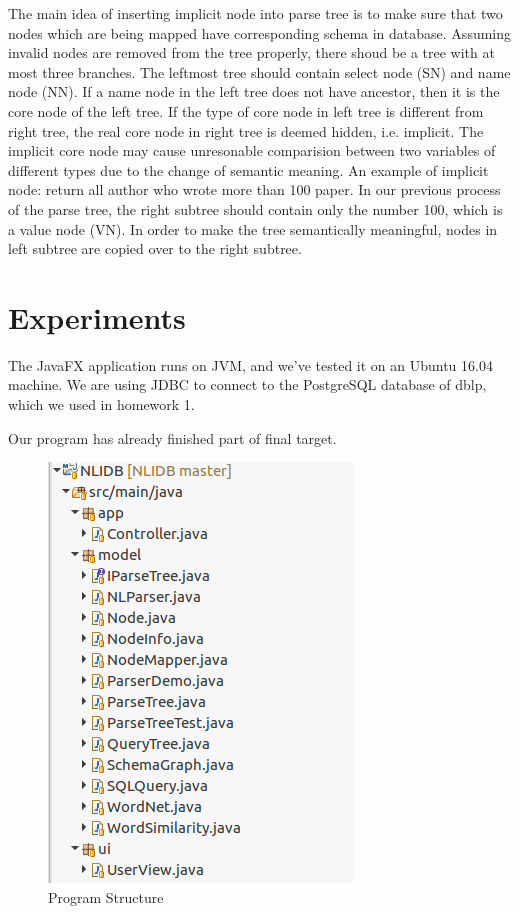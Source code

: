 \documentclass[twocolumn]{article}
\begin{document}
The main idea of inserting implicit node into parse tree is to make sure that two nodes which are being mapped have corresponding schema in database. Assuming invalid nodes are removed from the tree properly, there shoud be a tree with at most three branches. The leftmost tree should contain select node (SN) and name node (NN). If a name node in the left tree does not have ancestor, then it is the core node of the left tree. If the type of core node in left tree is different from right tree, the real core node in right tree is deemed hidden, i.e. implicit. The implicit core node may cause unresonable comparision between two variables of different types due to the change of semantic meaning. An example of implicit node: return all author who wrote more than 100 paper. In our previous process of the parse tree, the right subtree should contain only the number 100, which is a value node (VN). In order to make the tree semantically meaningful, nodes in left subtree are copied over to the right subtree.


\section{Experiments}
The JavaFX application runs on JVM, and we’ve tested it on an Ubuntu 16.04 machine. We are using JDBC to connect to the PostgreSQL database of dblp, which we used in homework 1.

Our program has already finished part of final target. 

\begin{figure}[ht]
  \centering
  \includegraphics[width=0.8\linewidth]{figures/program_structure.png}
  \caption{Program Structure}
\end{figure}
  
\end{document}
